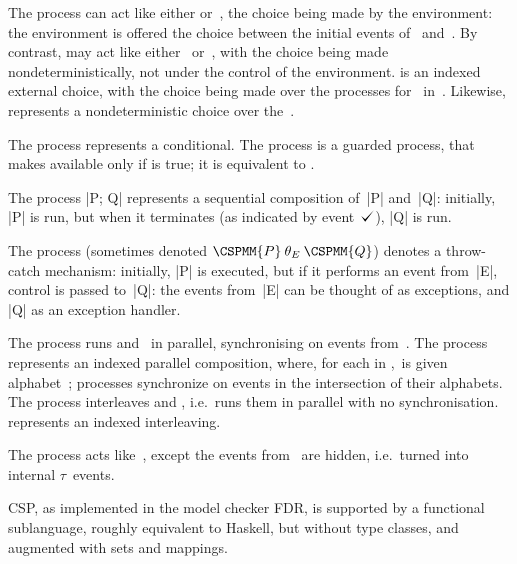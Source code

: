 The process  can act like either  or~, the choice
being made by the environment: the environment is offered the choice between
the initial events of~ and~.  By contrast,  may
act like either~ or~, with the choice being made
nondeterministically, not under the control of the environment.   is an indexed external choice, with the choice being made over
the processes  for~ in~.  Likewise, 
 represents a nondeterministic choice over the~.

The process  represents a conditional. 
The process  is a guarded process, that makes  available
only if  is true; it is equivalent to .

The process |P; Q| represents a sequential composition of~|P| and~|Q|:
initially, |P| is run, but when it terminates (as indicated by event~$\tick$),
|Q| is run. 

The process \CSPM{P [|E|> Q} 
(sometimes denoted $\CSPMM{P} \mathbin{\theta_E} \CSPMM{Q}$) denotes a
  throw-catch mechanism: initially, |P| is executed, but if it performs an
  event from~|E|, control is passed to~|Q|: the events from~|E| can be thought
  of as exceptions, and |Q| as an exception handler.

The process  runs  and~ in parallel,
synchronising on events from~.  The process  represents an indexed parallel composition, where, for each 
in ,\,  is given alphabet~; processes
synchronize on events in the intersection of their alphabets.  
The process  interleaves  and , i.e.\ runs them
in parallel with no synchronisation.   represents an
indexed interleaving.

The process  acts like~, except the events from~
are hidden, i.e.~turned into internal $\tau$~events.

CSP, as implemented in the model checker FDR, is supported by a functional
sublanguage, roughly equivalent to Haskell, but without type classes, and
augmented with sets and mappings. 
 
